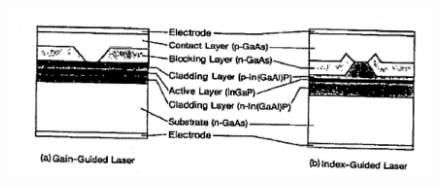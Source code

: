 \FloatBarrier
\begin{figure}[!h]
\centering
\includegraphics[scale=1]{../Grafiken/Halbleiterschicht_Struktur_Laserdiode.pdf}
\caption{\label{fig:halbleiterschicht_struktur_laserdiode}}
\end{figure}
\FloatBarrier